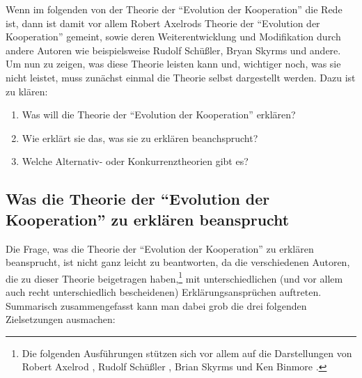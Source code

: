 \documentclass[12pt,a4paper,ngerman]{article}
\begin{document}
Wenn im folgenden von der Theorie der "`Evolution der Kooperation"'
die Rede ist, dann ist damit vor allem Robert Axelrods Theorie der
"`Evolution der Kooperation"' gemeint, sowie deren Weiterentwicklung
und Modifikation durch andere Autoren wie beispielsweise Rudolf
Schüßler, Bryan Skyrms und andere. Um nun zu zeigen, was diese
Theorie leisten kann und, wichtiger noch, was sie nicht leistet, muss
zunächst einmal die Theorie selbst dargestellt werden. Dazu ist
zu klären:

\begin{enumerate}

\item Was will die Theorie der "`Evolution der Kooperation"' erklären?

\item Wie erklärt sie das, was sie zu erklären beanchsprucht?

\item Welche Alternativ- oder Konkurrenztheorien gibt es?

\end{enumerate}

\subsection{Was die Theorie der "`Evolution der Kooperation"' zu
erklären beansprucht}

Die Frage, was die Theorie der "`Evolution der Kooperation"' zu
erklären beansprucht, ist nicht ganz leicht zu beantworten, da die
verschiedenen Autoren, die zu dieser Theorie beigetragen haben,\footnote{Die
folgenden Ausführungen stützen sich vor allem auf die Darstellungen von Robert
Axelrod \cite{axelrod:1984}, Rudolf Schüßler \cite{schuessler:1997}, Brian
Skyrms \cite{skyrms:1996, skyrms:2004} und Ken Binmore \cite{binmore:1994,
binmore:1998}.} mit unterschiedlichen (und vor allem auch recht unterschiedlich
bescheidenen) Erklärungsansprüchen auftreten.  Summarisch
zusammengefasst kann man dabei grob die drei folgenden Zielsetzungen
ausmachen:
\end{document}
